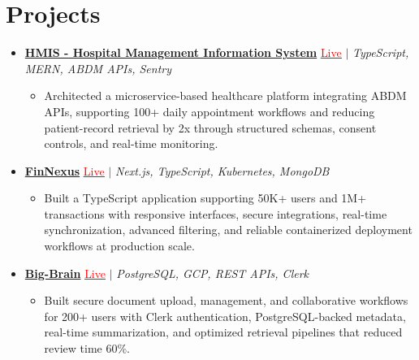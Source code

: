 \documentclass[letterpaper,10pt]{article}
\newcommand{\itemTail}{\vspace{-4pt}}
\newcommand{\projGap}{\vspace{3pt}}
\newcommand{\resumeItem}[1]{\item\small{{#1 \itemTail}}}
\newcommand{\resumeProjectHeading}[1]{\item \small #1 \vspace{-2pt}}
\newcommand{\resumeProjectLink}[2]{\href{#1}{\textcolor{red}{\underline{#2}}}}
\newcommand{\resumeSubHeadingListStart}{\begin{itemize}[leftmargin=0.0in, label={}]}
\newcommand{\resumeSubHeadingListEnd}{\end{itemize}}
\newcommand{\resumeProjItemListStart}{\begin{itemize}[leftmargin=0.15in,label=\textbullet,itemsep=3pt,topsep=0pt,parsep=0pt,partopsep=0pt]}
\newcommand{\resumeProjItemListEnd}{\end{itemize}\vspace{-4pt}}
\begin{document}
\section{Projects}
\resumeSubHeadingListStart
\vspace{-2pt}
\resumeProjectHeading{\href{https://hims-rouge.vercel.app/}{\textbf{HMIS - Hospital Management Information System}} \resumeProjectLink{https://hims-rouge.vercel.app/}{Live} $|$ \emph{TypeScript, MERN, ABDM APIs, Sentry}}
\resumeProjItemListStart
\resumeItem{Architected a microservice-based healthcare platform integrating ABDM APIs, supporting 100+ daily appointment workflows and reducing patient-record retrieval by 2x through structured schemas, consent controls, and real-time monitoring.}
\resumeProjItemListEnd
\projGap
\resumeProjectHeading{\href{https://fin-nexus.vercel.app/}{\textbf{FinNexus}} \resumeProjectLink{https://fin-nexus.vercel.app/}{Live} $|$ \emph{Next.js, TypeScript, Kubernetes, MongoDB}}
\resumeProjItemListStart
\resumeItem{Built a TypeScript application supporting 50K+ users and 1M+ transactions with responsive interfaces, secure integrations, real-time synchronization, advanced filtering, and reliable containerized deployment workflows at production scale.}
\resumeProjItemListEnd
\projGap
\resumeProjectHeading{\href{https://big-brain-pied.vercel.app/}{\textbf{Big-Brain}} \resumeProjectLink{https://big-brain-pied.vercel.app/}{Live} $|$ \emph{PostgreSQL, GCP, REST APIs, Clerk}}
\resumeProjItemListStart
\resumeItem{Built secure document upload, management, and collaborative workflows for 200+ users with Clerk authentication, PostgreSQL-backed metadata, real-time summarization, and optimized retrieval pipelines that reduced review time 60\%.}
\resumeProjItemListEnd
\resumeSubHeadingListEnd
\end{document}
